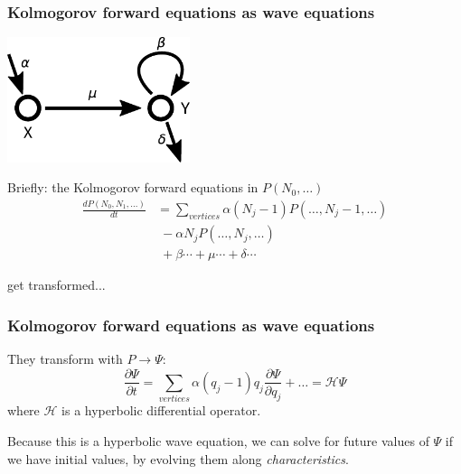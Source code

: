 \documentclass{beamer}
\begin{document}
\begin{frame}
    \frametitle{Kolmogorov forward equations as wave equations}

    \begin{center}
            \includegraphics[width=0.4\textwidth]{figures/diagram1}
    \end{center}

        Briefly: the Kolmogorov forward equations in $P(N_0, \dots)$
    \begin{align}
        \frac{d P(N_0, N_1, \dots)}{dt} &= \sum_{vertices} \alpha (N_j - 1)
        P(\dots, N_j - 1, \dots) \nonumber \\
        &\; - \alpha N_j P(\dots, N_j, \dots) \nonumber \\
        &\; + \beta \cdots + \mu \cdots + \delta \cdots \nonumber
    \end{align}

    get transformed...

\end{frame}

\begin{frame}
    \frametitle{Kolmogorov forward equations as wave equations}
    They transform with $P \rightarrow \Psi$:
    \begin{equation}
        \frac{\partial \Psi}{\partial t} = \sum_{vertices} \alpha (q_j - 1) q_j
        \frac{\partial \Psi}{\partial q_j} + \dots = \mathcal{H}\Psi
    \end{equation}
    where $\mathcal{H}$ is a hyperbolic differential operator.

    Because this is a hyperbolic wave equation, we can solve for future values
    of $\Psi$ if we have initial values, by evolving them along
    \emph{characteristics}.

\end{frame}
\end{document}
